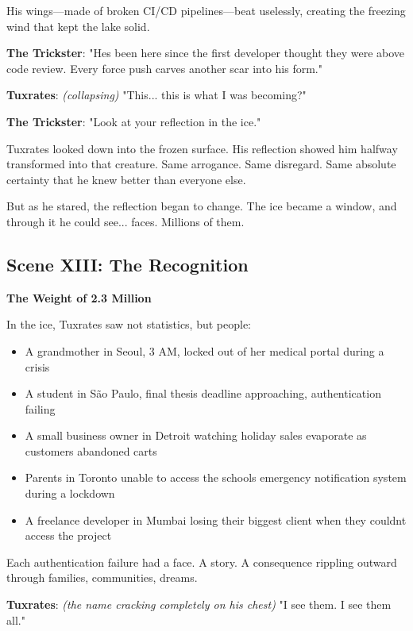 His wings---made of broken CI/CD pipelines---beat uselessly, creating the freezing wind that kept the lake solid.

\textbf{The Trickster}: "He\textquotesingle s been here since the first developer thought they were above code review. Every force push carves another scar into his form."

\textbf{Tuxrates}: \emph{(collapsing)} "This... this is what I was becoming?"

\textbf{The Trickster}: "Look at your reflection in the ice."

Tuxrates looked down into the frozen surface. His reflection showed him halfway transformed into that creature. Same arrogance. Same disregard. Same absolute certainty that he knew better than everyone else.

But as he stared, the reflection began to change. The ice became a window, and through it he could see... faces. Millions of them.

\bookdivider

\subsection{Scene XIII: The Recognition}\label{scene-xiii-the-recognition}

\textbf{The Weight of 2.3 Million}

In the ice, Tuxrates saw not statistics, but people:

\begin{itemize}
\tightlist
\item
  A grandmother in Seoul, 3 AM, locked out of her medical portal during a crisis
\item
  A student in São Paulo, final thesis deadline approaching, authentication failing
\item
  A small business owner in Detroit watching holiday sales evaporate as customers abandoned carts
\item
  Parents in Toronto unable to access the school\textquotesingle s emergency notification system during a lockdown
\item
  A freelance developer in Mumbai losing their biggest client when they couldn\textquotesingle t access the project
\end{itemize}

Each authentication failure had a face. A story. A consequence rippling outward through families, communities, dreams.

\textbf{Tuxrates}: \emph{(the name cracking completely on his chest)} "I see them. I see them all."

